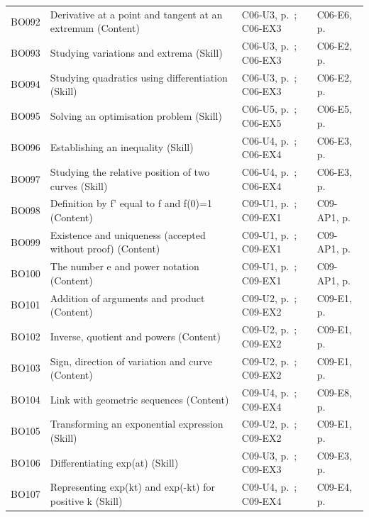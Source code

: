 \begin{longtable}{p{.1\linewidth}p{.43\linewidth}p{.19\linewidth}p{.16\linewidth}}
BO092 & Derivative at a point and tangent at an extremum (Content) & C06-U3, p.\,\pageref{C06-U3} ; C06-EX3 & C06-E6, p.\,\pageref{C06-E6} \\
BO093 & Studying variations and extrema (Skill) & C06-U3, p.\,\pageref{C06-U3} ; C06-EX3 & C06-E2, p.\,\pageref{C06-E2} \\
BO094 & Studying quadratics using differentiation (Skill) & C06-U3, p.\,\pageref{C06-U3} ; C06-EX3 & C06-E2, p.\,\pageref{C06-E2} \\
BO095 & Solving an optimisation problem (Skill) & C06-U5, p.\,\pageref{C06-U5} ; C06-EX5 & C06-E5, p.\,\pageref{C06-E5} \\
BO096 & Establishing an inequality (Skill) & C06-U4, p.\,\pageref{C06-U4} ; C06-EX4 & C06-E3, p.\,\pageref{C06-E3} \\
BO097 & Studying the relative position of two curves (Skill) & C06-U4, p.\,\pageref{C06-U4} ; C06-EX4 & C06-E3, p.\,\pageref{C06-E3} \\
BO098 & Definition by f' equal to f and f(0)=1 (Content) & C09-U1, p.\,\pageref{C09-U1} ; C09-EX1 & C09-AP1, p.\,\pageref{C09-AP1} \\
BO099 & Existence and uniqueness (accepted without proof) (Content) & C09-U1, p.\,\pageref{C09-U1} ; C09-EX1 & C09-AP1, p.\,\pageref{C09-AP1} \\
BO100 & The number e and power notation (Content) & C09-U1, p.\,\pageref{C09-U1} ; C09-EX1 & C09-AP1, p.\,\pageref{C09-AP1} \\
BO101 & Addition of arguments and product (Content) & C09-U2, p.\,\pageref{C09-U2} ; C09-EX2 & C09-E1, p.\,\pageref{C09-E1} \\
BO102 & Inverse, quotient and powers (Content) & C09-U2, p.\,\pageref{C09-U2} ; C09-EX2 & C09-E1, p.\,\pageref{C09-E1} \\
BO103 & Sign, direction of variation and curve (Content) & C09-U2, p.\,\pageref{C09-U2} ; C09-EX2 & C09-E1, p.\,\pageref{C09-E1} \\
BO104 & Link with geometric sequences (Content) & C09-U4, p.\,\pageref{C09-U4} ; C09-EX4 & C09-E8, p.\,\pageref{C09-E8} \\
BO105 & Transforming an exponential expression (Skill) & C09-U2, p.\,\pageref{C09-U2} ; C09-EX2 & C09-E1, p.\,\pageref{C09-E1} \\
BO106 & Differentiating exp(at) (Skill) & C09-U3, p.\,\pageref{C09-U3} ; C09-EX3 & C09-E3, p.\,\pageref{C09-E3} \\
BO107 & Representing exp(kt) and exp(-kt) for positive k (Skill) & C09-U4, p.\,\pageref{C09-U4} ; C09-EX4 & C09-E4, p.\,\pageref{C09-E4} \\

\end{longtable}
